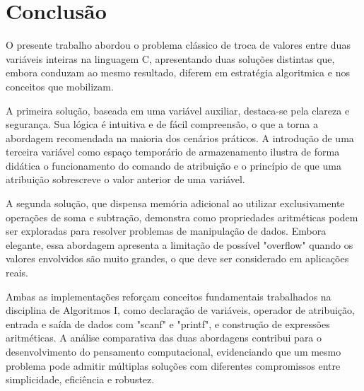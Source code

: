 \documentclass[12pt, a4paper]{article}
\begin{document}
\section*{Conclusão}


O presente trabalho abordou o problema clássico de troca de valores entre duas 
variáveis inteiras na linguagem C, apresentando duas soluções distintas que, 
embora conduzam ao mesmo resultado, diferem em estratégia algoritmica e nos 
conceitos que mobilizam.

       
A primeira solução, baseada em uma variável auxiliar, destaca-se pela clareza 
e segurança. Sua lógica é intuitiva e de fácil compreensão, o que a torna a 
abordagem recomendada na maioria dos cenários práticos. A introdução de uma 
terceira variável como espaço temporário de armazenamento ilustra de forma 
didática o funcionamento do comando de atribuição e o princípio de que uma 
atribuição sobrescreve o valor anterior de uma variável.


A segunda solução, que dispensa memória adicional ao utilizar exclusivamente 
operações de soma e subtração, demonstra como propriedades aritméticas podem 
ser exploradas para resolver problemas de manipulação de dados. Embora elegante, 
essa abordagem apresenta a limitação de possível "overflow" quando os valores 
envolvidos são muito grandes, o que deve ser considerado em aplicações reais.


Ambas as implementações reforçam conceitos fundamentais trabalhados na 
disciplina de Algoritmos I, como declaração de variáveis, operador de 
atribuição, entrada e saída de dados com "scanf" e "printf", e construção de 
expressões aritméticas. A análise comparativa das duas abordagens contribui 
para o desenvolvimento do pensamento computacional, evidenciando que um mesmo 
problema pode admitir múltiplas soluções com diferentes compromissos entre 
simplicidade, eficiência e robustez.


\end{document}
